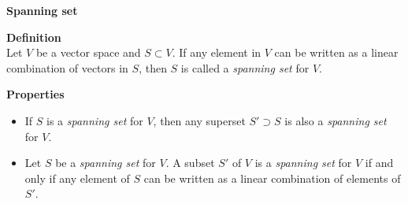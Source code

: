 \documentclass{article}
\begin{document}
\begin{framed}

    \textbf{Spanning set}

    \begin{framed}
    \textbf{Definition}\\
        Let $V$ be a vector space and $S\subset V$. If any element in $V$ can be written as a linear combination of vectors in $S$, then $S$ is called a \textit{spanning set} for $V$.
    \end{framed}

    \begin{framed}
        \textbf{Properties}
        \begin{itemize}
            \item If $S$ is a \textit{spanning set} for $V$, then any superset $S'\supset S$ is also a \textit{spanning set} for $V$.
            \item Let $S$ be a \textit{spanning set} for $V$. A subset $S'$ of $V$ is a \textit{spanning set} for $V$ if and only if any element of $S$ can be written as a linear combination of elements of $S'$.
        \end{itemize}
    \end{framed}

\end{framed}
\end{document}
